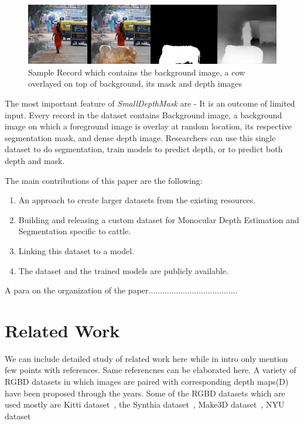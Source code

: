 \documentclass[review]{cvpr}
\begin{document}
\begin{figure}
  \begin{center}
    \includegraphics[width=1\textwidth]{samplerecord.png}
  \end{center}
  \caption{Sample Record which contains the background image, a cow overlayed on top of background, its mask and depth images}
  \label{fig:sampledatarecord}
\end{figure}

The most important feature of \textit{SmallDepthMask} are -  It is an outcome of limited input. Every record in the dataset contains Background image, a background image on which a foreground image is overlay at random location, its respective segmentation mask, and dense depth image. Researchers can use this single dataset to do segmentation, train models to predict depth, or to predict both depth and mask. 

The main contributions of this paper are the following:
\begin{enumerate}
\item An approach to create larger datasets from the existing resources.
\item Building and releasing a custom dataset for Monocular Depth Estimation and Segmentation specific to cattle.
\item Linking this dataset to a model.
\item The dataset and the trained models are publicly available.
\end{enumerate}

A para on the organization of the paper.......................................


\section {Related Work}
We can include detailed study of related work here while in intro only mention few points with references. Same referencnes can be elaborated here. 
A variety of RGBD datasets in which images are paired with corresponding depth maps(D) have been proposed through the years.
Some of the RGBD datasets which are used mostly are Kitti dataset~\cite{geiger2013vision}, the Synthia dataset~\cite{ros2016synthia}, 
Make3D dataset~\cite{saxena2008make3d}, NYU dataset~\cite{silberman2012indoor}
\end{document}
